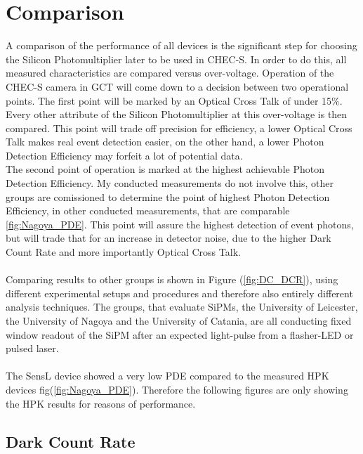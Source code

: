 \documentclass[12pt,article,type=msc,colorback,accentcolor=tud9c]{tudthesis}
\begin{document}
\section{\Large Comparison}
\label{sec:comparison}
A comparison of the performance of all devices is the significant step for choosing the Silicon Photomultiplier later to be used in CHEC-S. In order to do this, all measured characteristics are compared versus over-voltage. Operation of the CHEC-S camera in GCT will come down to a decision between two operational points. The first point will be marked by an Optical Cross Talk of under 15\%. Every other attribute of the Silicon Photomultiplier at this over-voltage is then compared. This point will trade off precision for efficiency, a lower Optical Cross Talk makes real event detection easier, on the other hand, a lower Photon Detection Efficiency may forfeit a lot of potential data.\\
The second point of operation is marked at the highest achievable Photon Detection Efficiency. My conducted measurements do not involve this, other groups are comissioned to determine the point of highest Photon Detection Efficiency, in other conducted measurements, that are comparable \ref{fig:Nagoya_PDE}. This point will assure the highest detection of event photons, but will trade that for an increase in detector noise, due to the higher Dark Count Rate and more importantly Optical Cross Talk.\\\\
Comparing results to other groups is shown in Figure (\ref{fig:DC_DCR}), using different experimental setups and procedures and therefore also entirely different analysis techniques. The groups, that evaluate SiPMs, the University of Leicester, the University of Nagoya and the University of Catania, are all conducting fixed window readout of the SiPM after an expected light-pulse from a flasher-LED or pulsed laser. \\\\
The SensL device showed a very low PDE compared to the measured HPK devices fig(\ref{fig:Nagoya_PDE}). Therefore the following figures are only showing the HPK results for reasons of performance.

\subsection{Dark Count Rate}
\label{subsec:DC_DCR}
\end{document}
